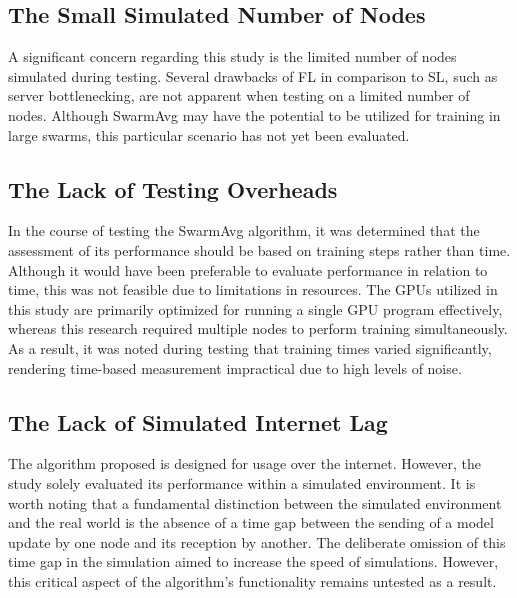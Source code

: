 \subsection{The Small Simulated Number of Nodes}
A significant concern regarding this study is the limited number of nodes simulated during testing. Several drawbacks of FL in comparison to SL, such as server bottlenecking, are not apparent when testing on a limited number of nodes. Although SwarmAvg may have the potential to be utilized for training in large swarms, this particular scenario has not yet been evaluated.

\subsection{The Lack of Testing Overheads}
In the course of testing the SwarmAvg algorithm, it was determined that the assessment of its performance should be based on training steps rather than time. Although it would have been preferable to evaluate performance in relation to time, this was not feasible due to limitations in resources. The GPUs utilized in this study are primarily optimized for running a single GPU program effectively, whereas this research required multiple nodes to perform training simultaneously. As a result, it was noted during testing that training times varied significantly, rendering time-based measurement impractical due to high levels of noise.

\subsection{The Lack of Simulated Internet Lag}
The algorithm proposed is designed for usage over the internet. However, the study solely evaluated its performance within a simulated environment. It is worth noting that a fundamental distinction between the simulated environment and the real world is the absence of a time gap between the sending of a model update by one node and its reception by another. The deliberate omission of this time gap in the simulation aimed to increase the speed of simulations. However, this critical aspect of the algorithm's functionality remains untested as a result.